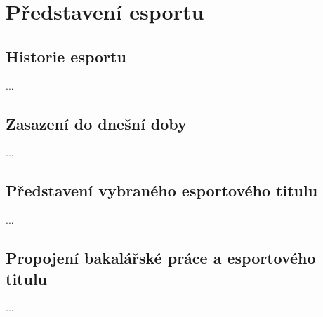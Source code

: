\chapter{Představení esportu}
\section{Historie esportu}
...

\section{Zasazení do dnešní doby}
...

\section{Představení vybraného esportového titulu}
...

\section{Propojení bakalářské práce a esportového titulu}
...
